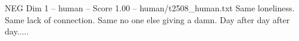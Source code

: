 \begin{textsample}{NEG Dim 1 – human – Score 1.00 – human/t2508\_human.txt}  \label{ex:f1_neg_018}
Same loneliness.
Same lack of connection.
Same no one else giving a damn.
Day after day after day.....

\end{textsample}
